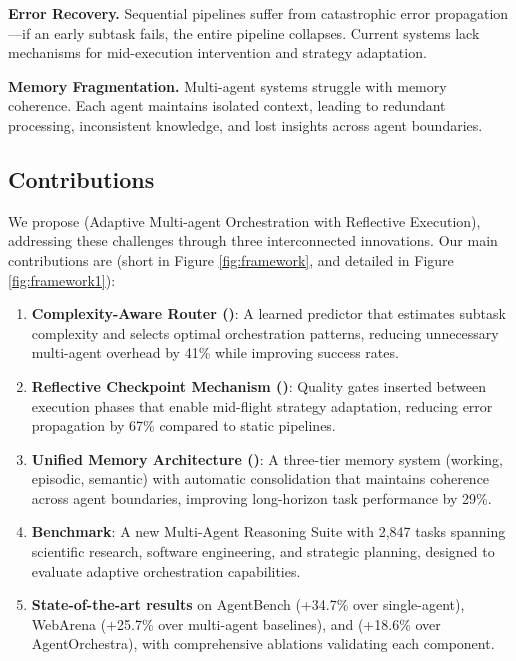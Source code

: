 \documentclass{article}
\theoremstyle{plain}
\theoremstyle{definition}
\theoremstyle{remark}
\begin{document}
\textbf{Error Recovery.} Sequential pipelines suffer from catastrophic error propagation---if an early subtask fails, the entire pipeline collapses. Current systems lack mechanisms for mid-execution intervention and strategy adaptation.

\textbf{Memory Fragmentation.} Multi-agent systems struggle with memory coherence. Each agent maintains isolated context, leading to redundant processing, inconsistent knowledge, and lost insights across agent boundaries.
%
\subsection{Contributions}
\label{sec:contributions}

We propose \textbf{\amore{}} (Adaptive Multi-agent Orchestration with Reflective Execution), addressing these challenges through three interconnected innovations. Our main contributions are (short in Figure \ref{fig:framework}, and detailed in Figure \ref{fig:framework1}):

\begin{enumerate}[nosep,leftmargin=*]
	\item \textbf{Complexity-Aware Router (\car{})}: A learned predictor that estimates subtask complexity and selects optimal orchestration patterns, reducing unnecessary multi-agent overhead by 41\% while improving success rates.
	
	\item \textbf{Reflective Checkpoint Mechanism (\rcm{})}: Quality gates inserted between execution phases that enable mid-flight strategy adaptation, reducing error propagation by 67\% compared to static pipelines.
	
	\item \textbf{Unified Memory Architecture (\uma{})}: A three-tier memory system (working, episodic, semantic) with automatic consolidation that maintains coherence across agent boundaries, improving long-horizon task performance by 29\%.
	
	\item \textbf{\mars{} Benchmark}: A new Multi-Agent Reasoning Suite with 2,847 tasks spanning scientific research, software engineering, and strategic planning, designed to evaluate adaptive orchestration capabilities.
	
	\item \textbf{State-of-the-art results} on AgentBench (+34.7\% over single-agent), WebArena (+25.7\% over multi-agent baselines), and \mars{} (+18.6\% over AgentOrchestra), with comprehensive ablations validating each component.
\end{enumerate}
\end{document}
